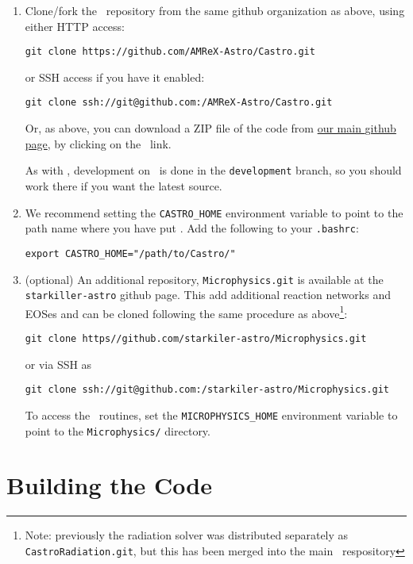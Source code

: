 \begin{enumerate}
\item Clone/fork the \castro\ repository from the same {\sf
  github} organization as above, using either HTTP access:
\begin{verbatim}
git clone https://github.com/AMReX-Astro/Castro.git
\end{verbatim}
or SSH access if you have it enabled:
\begin{verbatim}
git clone ssh://git@github.com:/AMReX-Astro/Castro.git
\end{verbatim}
Or, as above, you can download a ZIP file of the code from
\href{https://github.com/AMReX-Astro}{our main {\sf github} page},
by clicking on the \castro\ link.

As with \amrex, development on \castro\ is done in the
{\tt development} branch, so you should work there if you want
the latest source.

\item We recommend setting the {\tt CASTRO\_HOME} environment
  variable to point to the path name where you have put \castro.
  Add the following to your {\tt .bashrc}:
\begin{verbatim}
export CASTRO_HOME="/path/to/Castro/"
\end{verbatim}


\item (optional) An additional repository, {\tt Microphysics.git} is
  available at the {\tt starkiller-astro} github page.  This add
  additional reaction networks and EOSes and can be cloned following
  the same procedure as above\footnote{Note: previously the radiation
    solver was distributed separately as {\tt CastroRadiation.git},
    but this has been merged into the main \castro\ respository}:
\begin{verbatim}
git clone https//github.com/starkiler-astro/Microphysics.git
\end{verbatim}
or via SSH as
\begin{verbatim}
git clone ssh://git@github.com:/starkiler-astro/Microphysics.git
\end{verbatim}

To access the \microphysics\ routines, set the {\tt MICROPHYSICS\_HOME}
environment variable to point to the {\tt Microphysics/} directory.

\end{enumerate}


\section{Building the Code}

